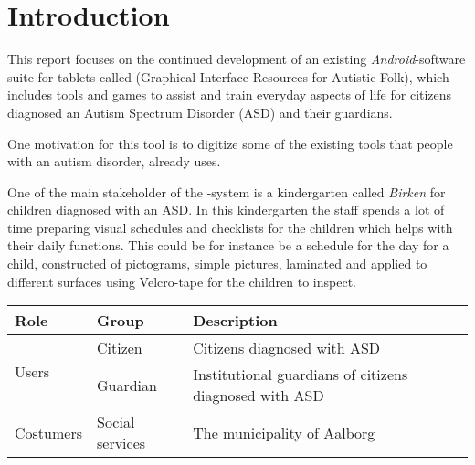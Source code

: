 \chapter{Introduction}
\label{cha:introduction}


This report focuses on the continued development of an existing \emph{Android}-software suite for tablets called \giraf(Graphical Interface Resources for Autistic Folk), which includes tools and games to assist and train everyday aspects of life for citizens diagnosed an Autism Spectrum Disorder (ASD) and their guardians. 

One motivation for this tool is to digitize some of the existing tools that people with an autism disorder, already uses. 

One of the main stakeholder of the \giraf-system is a kindergarten called \emph{Birken} for children diagnosed with an ASD. In this kindergarten the staff spends a lot of time preparing visual schedules and checklists for the children which helps with their daily functions. 
This could be for instance be a schedule for the day for a child, constructed of pictograms, simple pictures, laminated and applied to different surfaces using Velcro-tape for the children to inspect.

\begin{table}[!htbp]
    \begin{tabular}{|l|l|l|}
    \hline
    \textbf{Role}				& \textbf{Group}  & \textbf{Description}                                   \\ \hline
    \multirow{2}{*}{Users}      & Citizen         & Citizens diagnosed with ASD                            \\ \cline{2-3}
             					& Guardian        & Institutional guardians of citizens diagnosed with ASD \\ \hline
    Costumers 					& Social services & The municipality of Aalborg                            \\ \hline
    \end{tabular}
\end{table}



